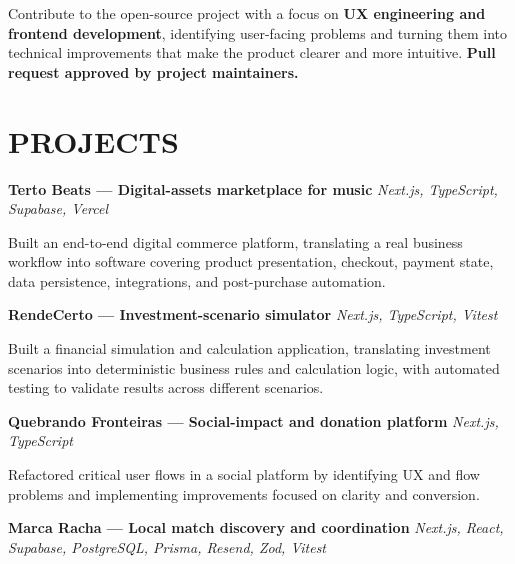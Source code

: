 \documentclass[10pt,a4paper]{article}
\begin{document}
\footnotesize

Contribute to the open-source project with a focus on
\textbf{UX engineering and frontend development}, identifying
user-facing problems and turning them into technical improvements
that make the product clearer and more intuitive.
\textbf{Pull request approved by project maintainers.}


\section*{PROJECTS}

\noindent
\textbf{Terto Beats — Digital-assets marketplace for music}
\hfill
\textit{Next.js, TypeScript, Supabase, Vercel}

\footnotesize

Built an end-to-end digital commerce platform, translating a
real business workflow into software covering product presentation,
checkout, payment state, data persistence, integrations,
and post-purchase automation.

\vspace{0.5pt}

\noindent
\textbf{RendeCerto — Investment-scenario simulator}
\hfill
\textit{Next.js, TypeScript, Vitest}

\footnotesize

Built a financial simulation and calculation application,
translating investment scenarios into deterministic business rules
and calculation logic, with automated testing to validate results
across different scenarios.

\vspace{0.5pt}

\noindent
\textbf{Quebrando Fronteiras — Social-impact and donation platform}
\hfill
\textit{Next.js, TypeScript}

\footnotesize

Refactored critical user flows in a social platform by identifying
UX and flow problems and implementing improvements focused on
clarity and conversion.


\vspace{0.5pt}

\noindent
\textbf{Marca Racha — Local match discovery and coordination}
\hfill
\textit{Next.js, React, Supabase, PostgreSQL, Prisma, Resend, Zod, Vitest}
\end{document}
